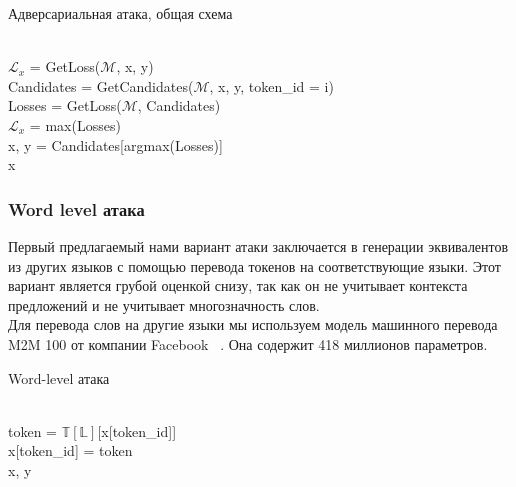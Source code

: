 \begin{algorithm}
    \caption{Адверсариальная атака, общая схема}
    \begin{algorithmic}
         \\
        $\mathcal{L}_{x}$ = GetLoss($\mathcal{M}$, x, y)
            \\
            \ind Candidates = GetCandidates($\mathcal{M}$, x, y, token\_id = i) \\
            \ind Losses = GetLoss($\mathcal{M}$, Candidates)
            \ind{}
                    \\
                    \ind\ind$\mathcal{L}_{x}$ = max(Losses) \\
                    \ind\ind x, y = Candidates[argmax(Losses)]
            \EndIf
        \EndFor \\
        \Return x
    \end{algorithmic}\label{alg:algorithm}
\end{algorithm}

\subsubsection{Word level атака}
Первый предлагаемый нами вариант атаки заключается в генерации эквивалентов из других языков с помощью перевода токенов на соответствующие языки.
Этот вариант является грубой оценкой снизу, так как он не учитывает контекста предложений и не учитывает многозначность слов. \\
Для перевода слов на другие языки мы используем модель машинного перевода M2M 100 от компании Facebook ~\cite{Fan2020BeyondEM}.
Она содержит 418 миллионов параметров.

\begin{algorithm}
    \caption{Word-level атака}
    \begin{algorithmic}
            \ind{}
                    \\
                    \ind\ind token = $\mathbb{T}[\mathbb{L}]$[x[token\_id]]\\
                    \ind\ind x[token\_id] = token
            \EndIf \\
            \Return x, y
        \EndFunction
    \end{algorithmic}\label{alg:algorithm1}
\end{algorithm}


